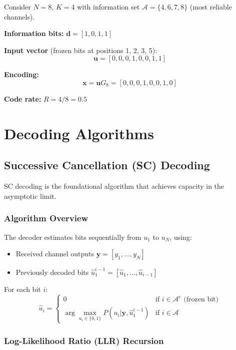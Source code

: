Consider $N = 8$, $K = 4$ with information set $\mathcal{A} = \{4, 6, 7, 8\}$ (most reliable channels).

\textbf{Information bits:} $\mathbf{d} = [1, 0, 1, 1]$

\textbf{Input vector} (frozen bits at positions 1, 2, 3, 5):
\begin{equation}
\mathbf{u} = [0, 0, 0, 1, 0, 0, 1, 1]
\end{equation}

\textbf{Encoding:}
\begin{equation}
\mathbf{x} = \mathbf{u} G_8 = [0, 0, 0, 1, 0, 0, 1, 0]
\end{equation}

\textbf{Code rate:} $R = 4/8 = 0.5$

\section{Decoding Algorithms}

\subsection{Successive Cancellation (SC) Decoding}

SC decoding is the foundational algorithm that achieves capacity in the asymptotic limit.

\subsubsection{Algorithm Overview}

The decoder estimates bits sequentially from $u_1$ to $u_N$, using:
\begin{itemize}
\item Received channel outputs $\mathbf{y} = [y_1, \ldots, y_N]$
\item Previously decoded bits $\hat{u}_1^{i-1} = [\hat{u}_1, \ldots, \hat{u}_{i-1}]$
\end{itemize}

For each bit $i$:
\begin{equation}
\hat{u}_i = \begin{cases}
0 & \text{if } i \in \mathcal{A}^c \text{ (frozen bit)} \\
\arg\max_{u_i \in \{0,1\}} P(u_i | \mathbf{y}, \hat{u}_1^{i-1}) & \text{if } i \in \mathcal{A}
\end{cases}
\end{equation}

\subsubsection{Log-Likelihood Ratio (LLR) Recursion}

